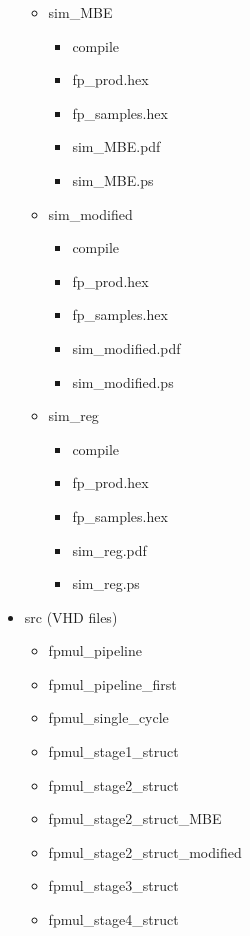 \begin{itemize}
\begin{itemize}
\begin{itemize}
        \end{itemize}
        \item sim\_MBE
         \begin{itemize}
            \item compile
            \item fp\_prod.hex
            \item fp\_samples.hex
            \item sim\_MBE.pdf
            \item sim\_MBE.ps
        \end{itemize}
        \item sim\_modified
         \begin{itemize}
            \item compile
            \item fp\_prod.hex
            \item fp\_samples.hex
            \item sim\_modified.pdf
            \item sim\_modified.ps
        \end{itemize}
        \item sim\_reg
         \begin{itemize}
            \item compile
            \item fp\_prod.hex
            \item fp\_samples.hex
            \item sim\_reg.pdf
            \item sim\_reg.ps
        \end{itemize}
    \end{itemize}
    \item src (VHD files)
        \begin{itemize}
            \item fpmul\_pipeline
            \item fpmul\_pipeline\_first
            \item fpmul\_single\_cycle
            \item fpmul\_stage1\_struct
            \item fpmul\_stage2\_struct
            \item fpmul\_stage2\_struct\_MBE
            \item fpmul\_stage2\_struct\_modified
            \item fpmul\_stage3\_struct
            \item fpmul\_stage4\_struct

\end{itemize}
\end{itemize}
